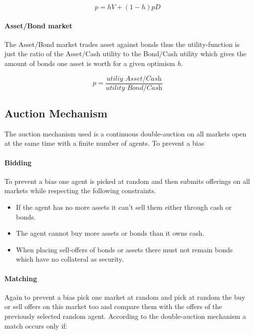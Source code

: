 \documentclass[../Bachelorarbeit.tex]{subfiles}
\begin{document}
\begin{equation}
p = h V + ( 1 - h )pD
\end{equation}

\paragraph{Asset/Bond market}
The Asset/Bond market trades asset against bonds thus the utility-function is just the ratio of the Asset/Cash utility to the Bond/Cash utility which gives the amount of bonds one asset is worth for a given optimism \textit{h}.

\begin{equation}
p = \frac{\textit{utiliy Asset/Cash}}{\textit{utility Bond/Cash}}
\end{equation}

\subsection{Auction Mechanism}
The auction mechanism used is a continuous double-auction on all markets open at the same time with a finite number of agents. To prevent a bias

\paragraph{Bidding}
To prevent a bias one agent is picked at random and then submits offerings on all markets while respecting the following constraints.

\begin{itemize}
\item If the agent has no more assets it can't sell them either through cash or bonds.
\item The agent cannot buy more assets or bonds than it owns cash.
\item When placing sell-offers of bonds or assets there must not remain bonds which have no collateral as security. 
\end{itemize}

\paragraph{Matching}
Again to prevent a bias pick one market at random and pick at random the buy or sell offers on this market too and compare them with the offers of the previously selected random agent. According to the double-auction mechanism a match occurs only if:
\end{document}
